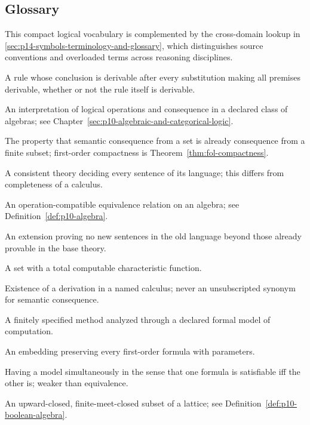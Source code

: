 \subsection{Glossary}
\label{sec:p14-glossary}

This compact logical vocabulary is complemented by the cross-domain lookup
in \cref{sec:p14-symbols-terminology-and-glossary}, which distinguishes
source conventions and overloaded terms across reasoning disciplines.

\begin{description}[style=nextline,leftmargin=0pt]
\item[admissible rule] A rule whose conclusion is derivable after every
substitution making all premises derivable, whether or not the rule itself is
derivable.
\item[algebraic semantics] An interpretation of logical operations and
consequence in a declared class of algebras; see Chapter~\ref{sec:p10-algebraic-and-categorical-logic}.
\item[compactness] The property that semantic consequence from a set is already
consequence from a finite subset; first-order compactness is
Theorem~\ref{thm:fol-compactness}.
\item[complete theory] A consistent theory deciding every sentence of its
language; this differs from completeness of a calculus.
\item[congruence] An operation-compatible equivalence relation on an algebra;
see Definition~\ref{def:p10-algebra}.
\item[conservative extension] An extension proving no new sentences in the old
language beyond those already provable in the base theory.
\item[decidable set] A set with a total computable characteristic function.
\item[derivability] Existence of a derivation in a named calculus; never an
unsubscripted synonym for semantic consequence.
\item[effective procedure] A finitely specified method analyzed through a
declared formal model of computation.
\item[elementary embedding] An embedding preserving every first-order formula
with parameters.
\item[equisatisfiable] Having a model simultaneously in the sense that one
formula is satisfiable iff the other is; weaker than equivalence.
\item[filter] An upward-closed, finite-meet-closed subset of a lattice; see
Definition~\ref{def:p10-boolean-algebra}.

\end{description}
